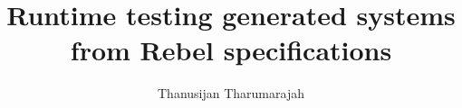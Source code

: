 \documentclass{uvamscse}
\title{Runtime testing generated systems from Rebel specifications}
\author{Thanusijan Tharumarajah}
\begin{document}
\maketitle





























{%


}
\end{document}
